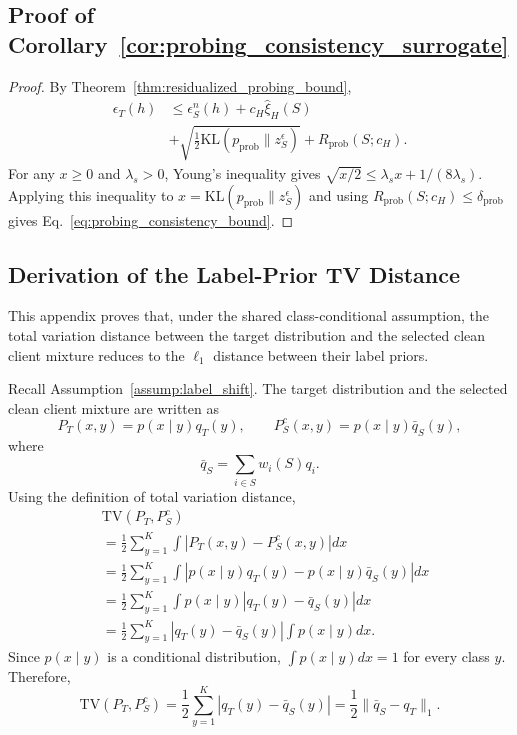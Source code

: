 \subsection{Proof of Corollary~\ref{cor:probing_consistency_surrogate}}
\begin{proof}
By Theorem~\ref{thm:residualized_probing_bound},
\begin{align}
\epsilon_T(h)
&\le
\epsilon_S^n(h)
+
c_H\widehat{\xi}_{H}(S) \\
&
+
\sqrt{
\frac12
\mathrm{KL}
\left(
p_{\mathrm{prob}}\|z_S^\epsilon
\right)
}
+
R_{\mathrm{prob}}(S;c_H).
\end{align}
For any $x\ge0$ and $\lambda_s>0$, Young's inequality gives
$\sqrt{x/2}\le \lambda_s x + 1/(8\lambda_s)$.
Applying this inequality to $x=\mathrm{KL}(p_{\mathrm{prob}}\|z_S^\epsilon)$ and using
$R_{\mathrm{prob}}(S;c_H)\le\delta_{\mathrm{prob}}$ gives Eq.~\eqref{eq:probing_consistency_bound}.
\end{proof}
\subsection{Derivation of the Label-Prior TV Distance}
\label{app:tv_label_prior}

This appendix proves that, under the shared class-conditional assumption, the total variation distance between the target distribution and the selected clean client mixture reduces to the $\ell_1$ distance between their label priors.

Recall Assumption~\ref{assump:label_shift}. 
The target distribution and the selected clean client mixture are written as
\[
P_T(x,y)=p(x\mid y)q_T(y),
\qquad
P_S^c(x,y)=p(x\mid y)\bar q_S(y),
\]
where
\[
\bar q_S=\sum_{i\in S}w_i(S)q_i.
\]
Using the definition of total variation distance,
\begin{align}
&\mathrm{TV}(P_T,P_S^c)\\
&=
\frac{1}{2}
\sum_{y=1}^{K}
\int
\left|
P_T(x,y)-P_S^c(x,y)
\right|
dx \\
&=
\frac{1}{2}
\sum_{y=1}^{K}
\int
\left|
p(x\mid y)q_T(y)
-
p(x\mid y)\bar q_S(y)
\right|
dx \\
&=
\frac{1}{2}
\sum_{y=1}^{K}
\int
p(x\mid y)
\left|
q_T(y)-\bar q_S(y)
\right|
dx \\
&=
\frac{1}{2}
\sum_{y=1}^{K}
\left|
q_T(y)-\bar q_S(y)
\right|
\int p(x\mid y)dx.
\end{align}
Since $p(x\mid y)$ is a conditional distribution, $\int p(x\mid y)dx=1$ for every class $y$. 
Therefore,
\begin{equation}
\mathrm{TV}(P_T,P_S^c)
=
\frac{1}{2}
\sum_{y=1}^{K}
\left|
q_T(y)-\bar q_S(y)
\right|
=
\frac{1}{2}
\|\bar q_S-q_T\|_1.
\end{equation}

